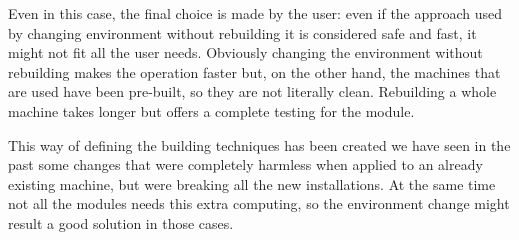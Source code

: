 \begin{itemize}
Even in this case, the final choice is made by the user: even if the
approach used by changing environment without rebuilding it is considered
safe and fast, it might not fit all the user needs. Obviously changing the
environment without rebuilding makes the operation faster but, on the
other hand, the machines that are used have been pre-built, so they are
not literally clean. Rebuilding a whole machine takes longer but offers
a complete testing for the module.

This way of defining the building techniques has been created we have seen
in the past some changes that were completely harmless when applied to an
already existing machine, but were breaking all the new installations. At
the same time not all the modules needs this extra computing, so the
environment change might result a good solution in those cases.

\end{itemize}

